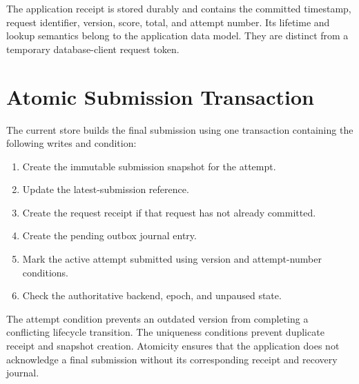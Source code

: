 The application receipt is stored durably and contains the committed timestamp, request identifier, version, score, total, and attempt number. Its lifetime and lookup semantics belong to the application data model. They are distinct from a temporary database-client request token.
\section{Atomic Submission Transaction}
The current store builds the final submission using one transaction containing the following writes and condition:
\begin{enumerate}
\item Create the immutable submission snapshot for the attempt.
\item Update the latest-submission reference.
\item Create the request receipt if that request has not already committed.
\item Create the pending outbox journal entry.
\item Mark the active attempt submitted using version and attempt-number conditions.
\item Check the authoritative backend, epoch, and unpaused state.
\end{enumerate}
The attempt condition prevents an outdated version from completing a conflicting lifecycle transition. The uniqueness conditions prevent duplicate receipt and snapshot creation. Atomicity ensures that the application does not acknowledge a final submission without its corresponding receipt and recovery journal.


